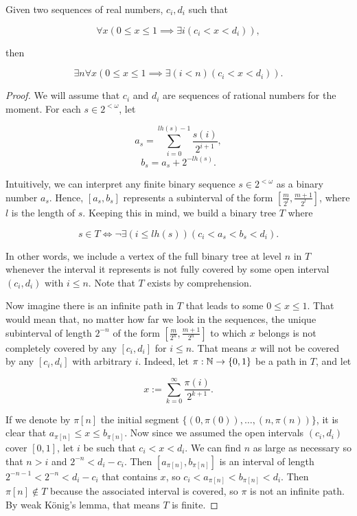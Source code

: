 \documentclass[../main.tex]{memoir}
\begin{document}
\begin{theorem}
  Given two sequences of real numbers, $c_i, d_i$ such that

  \[ \forall x (0 \le x \le 1 \implies \exists i (c_i < x < d_i)), \]

  then

  \[ \exists n \forall x (0 \le x \le 1 \implies \exists (i < n) (c_i < x < d_i)). \]
\end{theorem}
\begin{proof}
  We will assume that $c_i$ and $d_i$ are sequences of rational numbers for the moment. For each $s \in 2^{<\omega}$, let

  \[ a_s = \sum_{i = 0}^{lh(s) - 1} \frac{s(i)}{2^{i + 1}}, \]
  \[ b_s = a_s + 2^{-lh(s)}. \]

  Intuitively, we can interpret any finite binary sequence $s \in 2^{<\omega}$ as a binary number $a_s$. Hence, $[a_s, b_s]$ represents a subinterval of the form $[\frac{m}{2^l}, \frac{m + 1}{2^l}]$, where $l$ is the length of $s$. Keeping this in mind, we build a binary tree $T$ where

  \[ s \in T \iff \neg \exists (i \le lh(s)) (c_i < a_s < b_s < d_i). \]

  In other words, we include a vertex of the full binary tree at level $n$ in $T$ whenever the interval it represents is not fully covered by some open interval $(c_i, d_i)$ with $i \le n$. Note that $T$ exists by  comprehension.

  Now imagine there is an infinite path in $T$ that leads to some $0 \le x \le 1$. That would mean that, no matter how far we look in the sequences, the unique subinterval of length $2^{-n}$ of the form $[\frac{m}{2^n}, \frac{m + 1}{2^n}]$ to which $x$ belongs is not completely covered by any $[c_i, d_i]$ for $i \le n$. That means $x$ will not be covered by any $[c_i, d_i]$ with arbitrary $i$. Indeed, let $\pi: \mathbb{N} \to \{0, 1\}$ be a path in $T$, and let

  \[ x := \sum_{k = 0}^{\infty} \frac{\pi(i)}{2^{k + 1}}. \]

  If we denote by $\pi[n]$ the initial segment $\{(0, \pi(0)), \ldots, (n, \pi(n))\}$, it is clear that $a_{\pi[n]} \le x \le b_{\pi[n]}$. Now since we assumed the open intervals $(c_i, d_i)$ cover $[0, 1]$, let $i$ be such that $c_i < x < d_i$. We can find $n$ as large as necessary so that $n > i$ and $2^{-n} < d_i - c_i$. Then $[a_{\pi[n]}, b_{\pi[n]}]$ is an interval of length $2^{-n - 1} < 2^{-n} < d_i - c_i$ that contains $x$, so $c_i < a_{\pi[n]} < b_{\pi[n]} < d_i$. Then $\pi[n] \not\in T$ because the associated interval is covered, so $\pi$ is not an infinite path. By weak König's lemma, that means $T$ is finite.


\end{proof}
\end{document}
